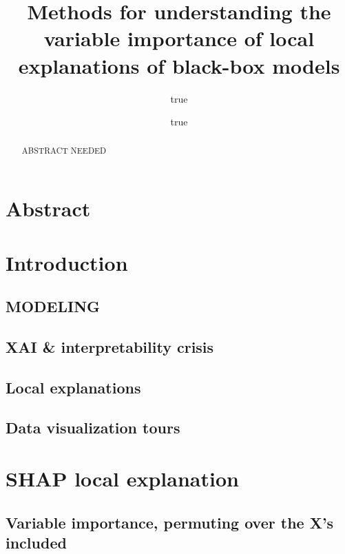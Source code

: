 \documentclass[
]{article}
\title{Methods for understanding the variable importance of local explanations of black-box models}
\author{true \and true}
\date{}
\begin{document}
\maketitle
\begin{abstract}
ABSTRACT NEEDED
\end{abstract}

\hypertarget{abstract}{%
\section{Abstract}\label{abstract}}

\hypertarget{sec:intro}{%
\section{Introduction}\label{sec:intro}}

\hypertarget{modeling}{%
\subsection{MODELING}\label{modeling}}

\hypertarget{xai-interpretability-crisis}{%
\subsection{XAI \& interpretability crisis}\label{xai-interpretability-crisis}}

\hypertarget{local-explanations}{%
\subsection{Local explanations}\label{local-explanations}}

\hypertarget{data-visualization-tours}{%
\subsection{Data visualization tours}\label{data-visualization-tours}}

\hypertarget{shap-local-explanation}{%
\section{SHAP local explanation}\label{shap-local-explanation}}

\hypertarget{variable-importance-permuting-over-the-xs-included}{%
\subsection{Variable importance, permuting over the X's included}\label{variable-importance-permuting-over-the-xs-included}}
\end{document}
